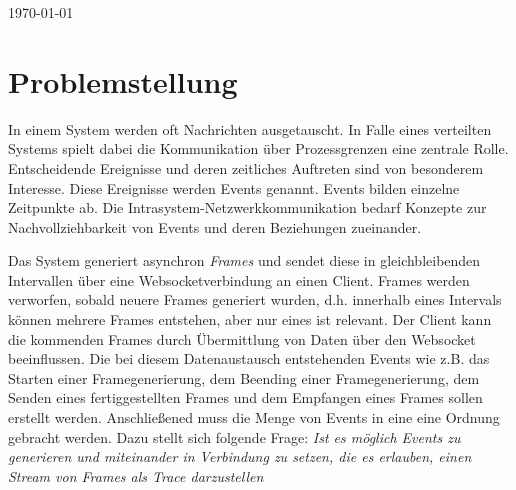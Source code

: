 \documentclass[a4paper]{article}
\begin{document}
\begin{titlepage}
	
	\vfill\vfill\vfill %
	
	{\large \today} %
	
	
	\vfill\vfill
	
	
	\vfill %
	
\end{titlepage}

\tableofcontents
\newpage
{}

\section{Problemstellung}
	In einem System werden oft Nachrichten ausgetauscht. In Falle eines verteilten Systems spielt dabei die Kommunikation über Prozessgrenzen eine zentrale Rolle.
	Entscheidende Ereignisse und deren zeitliches Auftreten sind von besonderem Interesse. Diese Ereignisse werden Events genannt. Events bilden einzelne Zeitpunkte ab. Die Intrasystem-Netzwerkkommunikation bedarf Konzepte zur Nachvollziehbarkeit von Events und deren Beziehungen zueinander. 
	
	Das System generiert asynchron \emph{Frames} und sendet diese in gleichbleibenden Intervallen über eine Websocketverbindung an einen Client. Frames werden verworfen, sobald neuere Frames generiert wurden, d.h. innerhalb eines Intervals können mehrere Frames entstehen, aber nur eines ist relevant. Der Client kann die kommenden Frames durch Übermittlung von Daten über den Websocket beeinflussen. Die bei diesem Datenaustausch entstehenden Events wie z.B. das Starten einer Framegenerierung, dem Beending einer Framegenerierung, dem Senden eines fertiggestellten Frames und dem Empfangen eines Frames sollen erstellt werden. Anschließened muss die Menge von Events in eine eine Ordnung gebracht werden. Dazu stellt sich folgende Frage: \emph{Ist es möglich Events zu generieren und miteinander in Verbindung zu setzen, die es erlauben, einen Stream von Frames als Trace darzustellen}
\end{document}
